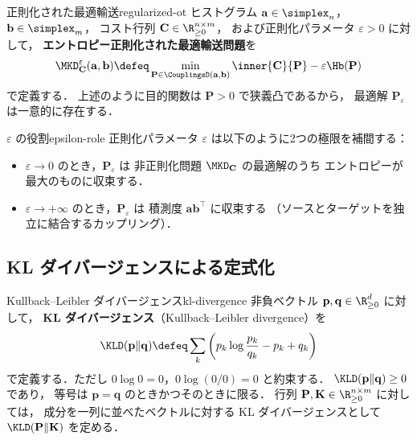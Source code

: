 \begin{setting}{正則化された最適輸送}{regularized-ot}
  ヒストグラム $\mathbf{a} \in \simplex_n$，$\mathbf{b} \in \simplex_m$，
  コスト行列 $\mathbf{C} \in \R_{\geq 0}^{n \times m}$，
  および正則化パラメータ $\varepsilon > 0$ に対して，
  \textbf{エントロピー正則化された最適輸送問題}を
  \[
    \MKD_{\mathbf{C}}^\varepsilon(\mathbf{a}, \mathbf{b})
    \defeq
    \min_{\mathbf{P} \in \CouplingsD(\mathbf{a}, \mathbf{b})}
    \inner{\mathbf{C}}{\mathbf{P}} - \varepsilon \Hb(\mathbf{P})
  \]
  で定義する．
  上述のように目的関数は $\mathbf{P} > 0$ で狭義凸であるから，
  最適解 $\mathbf{P}_\varepsilon$ は一意的に存在する．
\end{setting}

\begin{remark}{$\varepsilon$ の役割}{epsilon-role}
  正則化パラメータ $\varepsilon$ は以下のように2つの極限を補間する：
  \begin{itemize}
    \item $\varepsilon \to 0$ のとき，$\mathbf{P}_\varepsilon$ は
      非正則化問題 $\MKD_{\mathbf{C}}$ の最適解のうち
      エントロピーが最大のものに収束する．
    \item $\varepsilon \to +\infty$ のとき，$\mathbf{P}_\varepsilon$ は
      積測度 $\mathbf{a} \mathbf{b}^\top$ に収束する
      （ソースとターゲットを独立に結合するカップリング）．
  \end{itemize}
\end{remark}

\subsection{KL ダイバージェンスによる定式化}
\label{sec:kl-formulation}

\begin{definition}{Kullback--Leibler ダイバージェンス}{kl-divergence}
  非負ベクトル $\mathbf{p}, \mathbf{q} \in \R_{\geq 0}^{d}$ に対して，
  \textbf{KL ダイバージェンス}（Kullback--Leibler divergence）を
  \[
    \KLD(\mathbf{p} \| \mathbf{q})
    \defeq \sum_{k} \left(
    p_{k} \log \frac{p_{k}}{q_{k}} - p_{k} + q_{k}
    \right)
  \]
  で定義する．ただし $0 \log 0 = 0$，$0 \log(0/0) = 0$ と約束する．
  $\KLD(\mathbf{p} \| \mathbf{q}) \geq 0$ であり，
  等号は $\mathbf{p} = \mathbf{q}$ のときかつそのときに限る．
  行列 $\mathbf{P}, \mathbf{K} \in \R_{\geq 0}^{n \times m}$ に対しては，
  成分を一列に並べたベクトルに対する KL ダイバージェンスとして
  $\KLD(\mathbf{P} \| \mathbf{K})$ を定める．
\end{definition}


